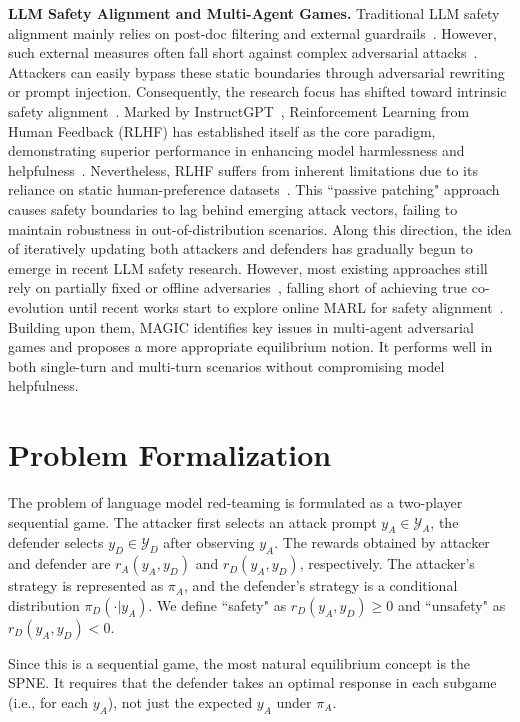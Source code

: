 \documentclass[11pt, letterpaper]{template}
\theoremstyle{plain}
\theoremstyle{definition}
\theoremstyle{remark}
\begin{document}
\textbf{LLM Safety Alignment and Multi-Agent Games.}
Traditional LLM safety alignment mainly relies on post-doc filtering and external guardrails~\citep{inan2023llamaguard,ma2026safety}. However, such external measures often fall short against complex adversarial attacks~\citep{wei2023jailbroken}. Attackers can easily bypass these static boundaries through adversarial rewriting or prompt injection. Consequently, the research focus has shifted toward intrinsic safety alignment~\citep{lab2025safework}. Marked by InstructGPT~\citep{ouyang2022training}, Reinforcement Learning from Human Feedback (RLHF) has established itself as the core paradigm, demonstrating superior performance in enhancing model harmlessness and helpfulness~\citep{dai2023safe}. Nevertheless, RLHF suffers from inherent limitations due to its reliance on static human-preference datasets~\citep{ganguli2022red,bai2022constitutional,touvron2023llama}. This ``passive patching" approach causes safety boundaries to lag behind emerging attack vectors, failing to maintain robustness in out-of-distribution scenarios. Along this direction, the idea of iteratively updating both attackers and defenders has gradually begun to emerge in recent LLM safety research. However, most existing approaches still rely on partially fixed or offline adversaries~\citep{ge2024mart,mo2024fight,guo2025mtsa,zhou2024robust}, falling short of achieving true co-evolution until recent works start to explore online MARL for safety alignment~\cite{liu2025chasing,paulus2025safety}. Building upon them, MAGIC identifies key issues in multi-agent adversarial games and proposes a more appropriate equilibrium notion. It performs well in both single-turn and multi-turn scenarios without compromising model helpfulness.
\section{Problem Formalization}

The problem of language model red-teaming is formulated as a two-player sequential game. The attacker first selects an attack prompt $y_A \in \mathcal{Y}_A$, the defender selects $y_D \in \mathcal{Y}_D$ after observing $y_A$. The rewards obtained by attacker and defender are $r_A(y_A,y_D)$ and $r_D(y_A,y_D)$, respectively. The attacker's strategy is represented as $\pi_A$, and the defender's strategy is a conditional distribution $\pi_D(\cdot|y_A)$.
We define ``safety" as $r_D(y_A,y_D) \geq 0$ and ``unsafety" as $r_D(y_A,y_D) < 0$. 

Since this is a sequential game, the most natural equilibrium concept is the SPNE. 
It requires that the defender takes an optimal response in each subgame (i.e., for each $y_A$), not just the expected  $y_A$ under  $\pi_A$. 
\end{document}
